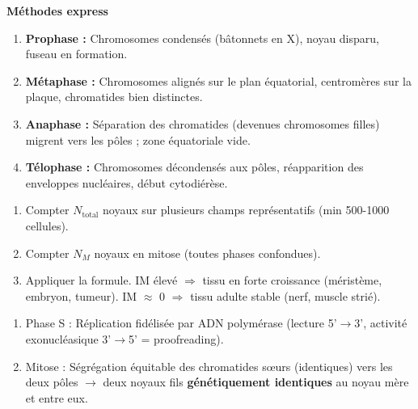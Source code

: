 \documentclass[11pt]{article}
\newcommand{\cle}[1]{{\popxbold\color{popdark}#1}}
\begin{document}
\begin{bilan}
\textbf{Méthodes express}
\begin{methode}
\begin{enumerate}
  \item \textbf{Prophase :} Chromosomes condensés (bâtonnets en X), noyau disparu, fuseau en formation.
  \item \textbf{Métaphase :} Chromosomes alignés sur le \cle{plan équatorial}, centromères sur la plaque, chromatides bien distinctes.
  \item \textbf{Anaphase :} Séparation des chromatides (devenues chromosomes filles) migrent vers les pôles ; zone équatoriale vide.
  \item \textbf{Télophase :} Chromosomes décondensés aux pôles, réapparition des enveloppes nucléaires, début cytodiérèse.
\end{enumerate}
\end{methode}

\begin{methode}
\begin{enumerate}
  \item Compter $N_{\text{total}}$ noyaux sur plusieurs champs représentatifs (min 500-1000 cellules).
  \item Compter $N_M$ noyaux en mitose (toutes phases confondues).
  \item Appliquer la formule. IM élevé $\Rightarrow$ tissu en forte croissance (méristème, embryon, tumeur). IM $\approx$ 0 $\Rightarrow$ tissu adulte stable (nerf, muscle strié).
\end{enumerate}
\end{methode}

\begin{methode}
\begin{enumerate}
  \item Phase S : Réplication fidélisée par ADN polymérase (lecture 5'$\to$3', activité exonucléasique 3'$\to$5' = \cle{proofreading}).
  \item Mitose : Ségrégation équitable des chromatides sœurs (identiques) vers les deux pôles $\to$ deux noyaux fils \textbf{génétiquement identiques} au noyau mère et entre eux.
\end{enumerate}
\end{methode}

\end{bilan}
\end{document}
